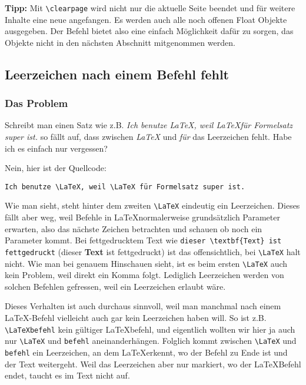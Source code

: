 			\textbf{Tipp:}
			Mit \lstinline|\clearpage| wird nicht nur die aktuelle Seite beendet und für weitere Inhalte eine neue angefangen. Es werden auch alle noch offenen Float Objekte ausgegeben. Der Befehl bietet also eine einfach Möglichkeit dafür zu sorgen, das Objekte nicht in den nächsten Abschnitt mitgenommen werden.
		
	
		\subsection{Leerzeichen nach einem Befehl fehlt}
			\subsubsection*{Das Problem}
				Schreibt man einen Satz wie z.B. \emph{Ich benutze \LaTeX, weil \LaTeX für Formelsatz super ist.} so fällt auf, dass zwischen \emph{\LaTeX{}} und \emph{für} das Leerzeichen fehlt.			
				Habe ich es einfach nur vergessen?
				
				Nein, hier ist der Quellcode:
				\bigskip
				
				\lstinline[language=thesis-latexbeispiel, showspaces=true]|Ich benutze \LaTeX, weil \LaTeX für Formelsatz super ist.|
				\bigskip
			
				Wie man sieht, steht hinter dem zweiten \lstinline[language=thesis-latexbeispiel]|\LaTeX| eindeutig ein Leerzeichen. Dieses fällt aber weg, weil Befehle in \LaTeX normalerweise grundsätzlich Parameter erwarten, also das nächste Zeichen betrachten und schauen ob noch ein Parameter kommt. Bei fettgedrucktem Text wie \lstinline[language=thesis-latexbeispiel]|dieser \textbf{Text} ist fettgedruckt| (dieser \textbf{Text} ist fettgedruckt) ist das offensichtlich, bei \lstinline[language=thesis-latexbeispiel]|\LaTeX| halt nicht. Wie man bei genauem Hinschauen sieht, ist es beim ersten \lstinline[language=thesis-latexbeispiel]|\LaTeX| auch kein Problem, weil direkt ein Komma folgt. Lediglich Leerzeichen werden von solchen Befehlen \glqq gefressen\grqq, weil ein Leerzeichen erlaubt wäre.
				
				Dieses Verhalten ist auch durchaus sinnvoll, weil man manchmal nach einem \LaTeX-Befehl vielleicht auch gar kein Leerzeichen haben will. So ist z.B. \lstinline|\LaTeXbefehl| kein gültiger \LaTeX befehl, und eigentlich wollten wir hier ja auch nur \lstinline[language=thesis-latexbeispiel]|\LaTeX| und \lstinline|befehl| aneinanderhängen. Folglich kommt zwischen \lstinline[language=thesis-latexbeispiel]|\LaTeX| und \lstinline|befehl| ein Leerzeichen, an dem \LaTeX erkennt, wo der Befehl zu Ende ist und der Text weitergeht. Weil das Leerzeichen aber nur markiert, wo der \LaTeX Befehl endet, taucht es im Text nicht auf.
